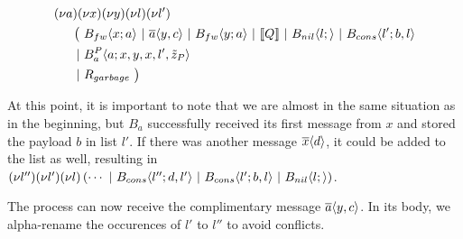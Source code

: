\begin{align*}
  &\anew{a}{\anew{x}{\anew{y}{\anew{l}{\anew{l'}{ \\
    &\hspace{0.5cm}
    \begin{aligned}[t]
      \big(\ &\ains{B_{fw}}{x}{a}
      \apar   \asnd{a}{y,c}
      \apar   \ains{B_{fw}}{y}{a}
      \apar   \encMJtoAP{Q}
      \apar   \ains{B_{nil}}{l}{}
      \apar   \ains{B_{cons}}{l'}{b, l}
      \\
      \apar  &\ains{B_a^P}{a}{x, y, x, l',\tilde{z}_P}
      \\
      \apar  &R_{garbage}
      \ \big)
    \end{aligned}
  }}}}}
\end{align*}

At this point, it is important to note that we are almost in the same situation
as in the beginning,
but $B_a$ successfully received its first message from $x$ and stored
the payload $b$ in list $l'$.
If there was another message $\overline{x}\langle d\rangle$, it could be added to the list as well,
resulting in
$\anew{l''}{\anew{l'}{\anew*{l}{
  \cdots \apar \ains{B_{cons}}{l''}{d,l'} \apar \ains{B_{cons}}{l'}{b,l} \apar \ains{B_{nil}}{l}{}
}}}$.

The process can now receive the complimentary message $\overline{a}\langle y,c\rangle$.
In its body, we alpha-rename the occurences of $l'$ to $l''$ to avoid conflicts.


